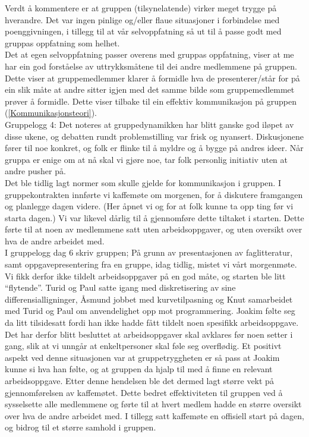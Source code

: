 Verdt å kommentere er at gruppen (tilsynelatende) virker meget trygge på hverandre.
Det var ingen pinlige og/eller flaue situasjoner i forbindelse med
poenggivningen, i tillegg til at vår selvoppfatning så ut til å passe godt med
gruppas oppfatning som helhet.\\

Det at egen selvoppfatning passer overens med gruppas oppfatning, viser at me har ein god
forståelse av uttrykksmåtene til dei andre medlemmene på gruppen. Dette viser at gruppemedlemmer
klarer å formidle hva de presenterer/står for på ein slik måte at andre sitter igjen med det samme bilde 
som gruppemedlemmet prøver å formidle. Dette viser tilbake til ein effektiv kommunikasjon på gruppen 
(\ref{Kommunikasjonsteori}).\\

Gruppelogg 4:
Det noteres at gruppedynamikken har blitt ganske god iløpet av disse ukene, og
debatten rundt problemstilling var frisk og nyansert. Diskusjonene fører til noe
konkret, og folk er flinke til å myldre og å bygge på andres ideer. Når gruppa
er enige om at nå skal vi gjøre noe, tar folk personlig initiativ uten at andre
pusher på.\\
Det ble tidlig lagt normer som skulle gjelde for kommunikasjon i gruppen. I gruppekontrakten innførte vi kaffemøte om morgenen, 
for å diskutere framgangen og planlegge dagen videre. (Her åpnet vi og for at folk kunne ta opp ting før vi starta dagen.) 
Vi var likevel dårlig til å gjennomføre dette tiltaket i starten. Dette førte til at noen av medlemmene satt uten arbeidsoppgaver,
 og uten oversikt over hva de andre arbeidet med. \\

I gruppelogg dag 6 skriv gruppen;
På grunn av presentasjonen av faglitteratur, samt oppgavepresentering fra en gruppe,
idag tidlig, mistet vi vårt morgenmøte. Vi fikk derfor ikke tildelt arbeidsoppgaver på                                                         
en god måte, og starten ble litt ``flytende''. Turid og Paul satte igang med diskretisering
av sine differensialligninger, Åsmund jobbet med kurvetilpasning og Knut samarbeidet
med Turid og Paul om anvendelighet opp mot programmering. Joakim følte seg da litt
tilsidesatt fordi han ikke hadde fått tildelt noen spesifikk arbeidsoppgave. Det har derfor
blitt besluttet at arbeidsoppgaver skal avklares før noen setter i gang, slik at vi unngår at                                           
enkeltpersoner skal føle seg overflødig. Et positivt aspekt ved denne situasjonen var at
gruppetryggheten er så pass at Joakim kunne si hva han følte, og at gruppen da hjalp til
med å finne en relevant arbeidsoppgave. Etter denne hendelsen ble det dermed lagt større vekt 
på gjennomførelsen av kaffemøtet. Dette bedret effektiviteten til gruppen ved å sysselsette 
alle medlemmene og førte til at hvert medlem hadde en større oversikt over hva de andre arbeidet
med. I tillegg satt kaffemøte en offisiell start på dagen, og bidrog til et større samhold i gruppen. \\\

